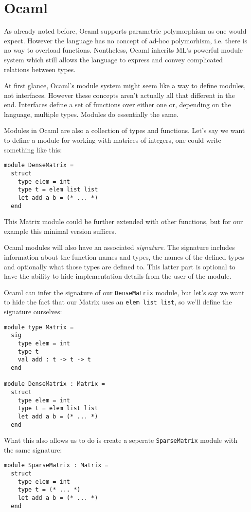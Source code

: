 \section{Ocaml}

As already noted before, Ocaml supports parametric polymorphism as one would expect. However the language has no concept of ad-hoc polymorhism, i.e. there is no way to overload functions. Nontheless, Ocaml inherits ML's powerful module system which still allows the language to express and convey complicated relations between types.

At first glance, Ocaml's module system might seem like a way to define modules, not interfaces. However these concepts aren't actually all that different in the end. Interfaces define a set of functions over either one or, depending on the language, multiple types. Modules do essentially the same.

Modules in Ocaml are also a collection of types and functions. Let's say we want to define a module for working with matrices of integers, one could write something like this:
\begin{verbatim}
module DenseMatrix =
  struct
    type elem = int
    type t = elem list list
    let add a b = (* ... *)
  end
\end{verbatim}
This Matrix module could be further extended with other functions, but for our example this minimal version suffices.

Ocaml modules will also have an associated \textit{signature}. The signature includes information about the function names and types, the names of the defined types and optionally what those types are defined to. This latter part is optional to have the ability to hide implementation details from the user of the module.

Ocaml can infer the signature of our \verb|DenseMatrix| module, but let's say we want to hide the fact that our Matrix uses an \verb|elem list list|, so we'll define the signature ourselves:
\begin{verbatim}
module type Matrix =
  sig
    type elem = int
    type t
    val add : t -> t -> t
  end

module DenseMatrix : Matrix =
  struct
    type elem = int
    type t = elem list list
    let add a b = (* ... *)
  end
\end{verbatim}
What this also allows us to do is create a seperate \verb|SparseMatrix| module with the same signature:
\begin{verbatim}
module SparseMatrix : Matrix =
  struct
    type elem = int
    type t = (* ... *)
    let add a b = (* ... *)
  end
\end{verbatim}

